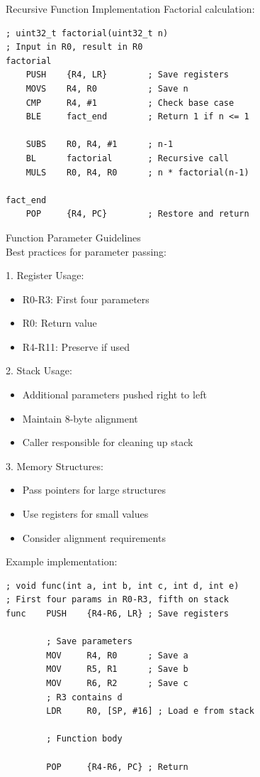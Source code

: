 \begin{example2}{Recursive Function Implementation}
Factorial calculation:
\begin{lstlisting}[language=armasm, style=base]
; uint32_t factorial(uint32_t n)
; Input in R0, result in R0
factorial
    PUSH    {R4, LR}        ; Save registers
    MOVS    R4, R0          ; Save n
    CMP     R4, #1          ; Check base case
    BLE     fact_end        ; Return 1 if n <= 1
    
    SUBS    R0, R4, #1      ; n-1
    BL      factorial       ; Recursive call
    MULS    R0, R4, R0      ; n * factorial(n-1)
    
fact_end
    POP     {R4, PC}        ; Restore and return
\end{lstlisting}
\end{example2}

\begin{KR}{Function Parameter Guidelines}\\
Best practices for parameter passing:

1. Register Usage:
\begin{itemize}
  \item R0-R3: First four parameters
  \item R0: Return value
  \item R4-R11: Preserve if used
\end{itemize}

2. Stack Usage:
\begin{itemize}
  \item Additional parameters pushed right to left
  \item Maintain 8-byte alignment
  \item Caller responsible for cleaning up stack
\end{itemize}

3. Memory Structures:
\begin{itemize}
  \item Pass pointers for large structures
  \item Use registers for small values
  \item Consider alignment requirements
\end{itemize}

Example implementation:
\begin{lstlisting}[language=armasm, style=base]
; void func(int a, int b, int c, int d, int e)
; First four params in R0-R3, fifth on stack
func    PUSH    {R4-R6, LR} ; Save registers
        
        ; Save parameters
        MOV     R4, R0      ; Save a
        MOV     R5, R1      ; Save b
        MOV     R6, R2      ; Save c
        ; R3 contains d
        LDR     R0, [SP, #16] ; Load e from stack
        
        ; Function body
        
        POP     {R4-R6, PC} ; Return
\end{lstlisting}
\end{KR}

